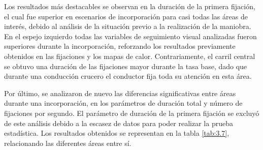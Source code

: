 Los resultados más destacables se observan en la duración de la primera fijación, el cual fue superior en escenarios de incorporación para casi todas las áreas de interés, debido al análisis de la situación previo a la realización de la maniobra. En el espejo izquierdo todas las variables de seguimiento visual analizadas fueron superiores durante la incorporación, reforzando los resultados previamente obtenidos en las fijaciones y los mapas de calor. Contrariamente, el carril central se obtuvo una duración de las fijaciones mayor durante la tasa base, dado que durante una conducción crucero el conductor fija toda su atención en esta área. 

Por último, se analizaron de nuevo las diferencias significativas entre áreas durante una incorporación, en los parámetros de duración total y número de fijaciones por segundo. El parámetro de duración de la primera fijación se excluyó de este análisis debido a la escasez de datos para poder realizar la prueba estadística. Los resultados obtenidos se representan en la tabla \ref{tab:3.7}, relacionando las diferentes áreas entre sí.

